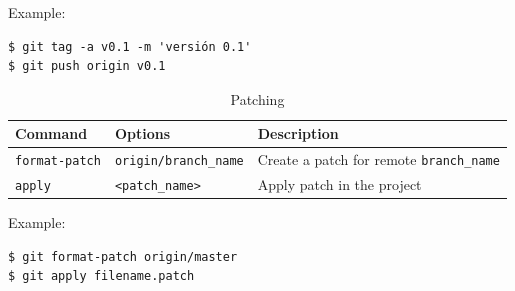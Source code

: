 \documentclass[a4paper,10pt]{article}
\newenvironment{terminal}
  {
    \vspace{+10pt}
    \begin{center}
    \begin{minipage}{0.95\textwidth}
    \begin{framed}
  }
  {
    \end{framed}
    \end{minipage}
    \end{center}
    \vspace{+10pt}
  }
\begin{document}
Example:

\begin{terminal}
\begin{verbatim}
$ git tag -a v0.1 -m 'versión 0.1'
$ git push origin v0.1
\end{verbatim}
\end{terminal}

\begin{table}[h]
\caption{Patching}
\centering
\begin{tabular}{l l l}
\hline\hline
Command & Options & Description \\
\hline\hline
\multirow{1}{*}{\texttt{format-patch}} & \texttt{origin/branch\_name} & Create a patch for remote \texttt{branch\_name} \\ \hline
\multirow{1}{*}{\texttt{apply}} & \texttt{<patch\_name>} & Apply patch in the project \\ \hline
\end{tabular}
\end{table}

Example:

\begin{terminal}
\begin{verbatim}
$ git format-patch origin/master
$ git apply filename.patch
\end{verbatim}
\end{terminal}
\end{document}
